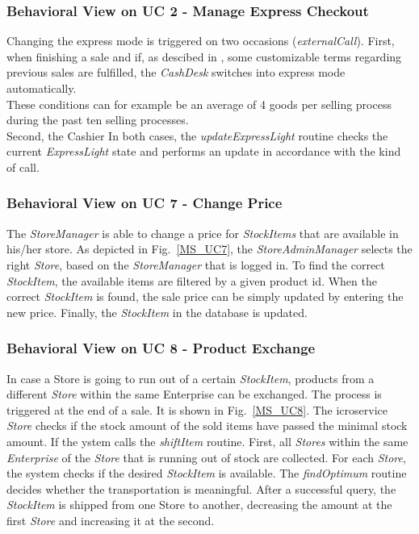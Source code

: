 		\subsubsection*{Behavioral View on UC 2 - Manage Express Checkout}
		Changing the express mode is triggered on two occasions (\textit{externalCall}). 
		First, when finishing a sale and if, as descibed in \cite{herold2008}, some customizable terms regarding previous sales are fulfilled, the \textit{CashDesk} switches into express mode automatically.\\ These conditions can for example be an average of 4 goods per selling process during the past ten selling processes.\\
		Second, the Cashier 
		In both cases, the \textit{updateExpressLight} routine checks the current \textit{ExpressLight} state and performs an update in accordance with the kind of call.
		
		\subsubsection*{Behavioral View on UC 7 - Change Price}
		The \textit{StoreManager} is able to change a price for \textit{StockItems} that are available in his/her store. 
		As depicted in Fig.~\ref{MS_UC7}, the \textit{StoreAdminManager} selects the right \textit{Store}, based on the \textit{StoreManager} that is logged in. 
		To find the correct \textit{StockItem}, the available items are filtered by a given product id. 
		When the correct \textit{StockItem} is found, the sale price can be simply updated by entering the new price. 
		Finally, the \textit{StockItem} in the database is updated.
		
		\subsubsection*{Behavioral View on UC 8 - Product Exchange}
		In case a Store is going to run out of a certain \textit{StockItem}, products from a different \textit{Store} within the same Enterprise can be exchanged. 
		The process is triggered at the end of a sale. 
		It is shown in  Fig.~\ref{MS_UC8}. 
		The icroservice \textit{Store} checks if the stock amount of the sold items have passed the minimal stock amount. 
		If  the ystem calls the \textit{shiftItem} routine. 
		First, all \textit{Stores} within the same \textit{Enterprise} of the \textit{Store} that is running out of stock are collected.
		For each \textit{Store}, the system checks if the desired \textit{StockItem} is available. 
		The \textit{findOptimum} routine decides whether the transportation is meaningful. 
		After a successful query, the \textit{StockItem} is shipped from one Store to another, decreasing the amount at the first \textit{Store} and increasing it at the second.

